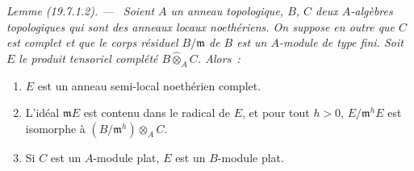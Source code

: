 \documentclass[10pt,oneside]{book}
\makeatletter
\newcommand{\setmanualcurrentlabel}[1]{\def\@currentlabel{#1}}
\newenvironment{lemma}[1][]{%
  \setmanualcurrentlabel{#1}\par\medskip\noindent\itshape Lemme (#1). ---\ }{\par}
\makeatother
\begin{document}
\begin{lemma}[19.7.1.2]
\label{0.19.7.1.2-fr}
Soient $A$ un anneau topologique, $B$, $C$ deux $A$-algèbres topologiques qui
sont des anneaux locaux noethériens. On suppose en outre que $C$ est complet
et que le corps résiduel $B/\mathfrak m$ de $B$ est un $A$-module de type fini.
Soit $E$ le produit tensoriel complété $B\widehat\otimes_A C$. Alors~:
\begin{enumerate}
  \item[(i)] $E$ est un anneau semi-local noethérien complet.
  \item[(ii)] L'idéal $\mathfrak mE$ est contenu dans le radical de $E$, et
  pour tout $h>0$, $E/\mathfrak m^hE$ est isomorphe à
  $(B/\mathfrak m^h)\otimes_A C$.
  \item[(iii)] Si $C$ est un $A$-module plat, $E$ est un $B$-module plat.
\end{enumerate}
\end{lemma}
\end{document}
